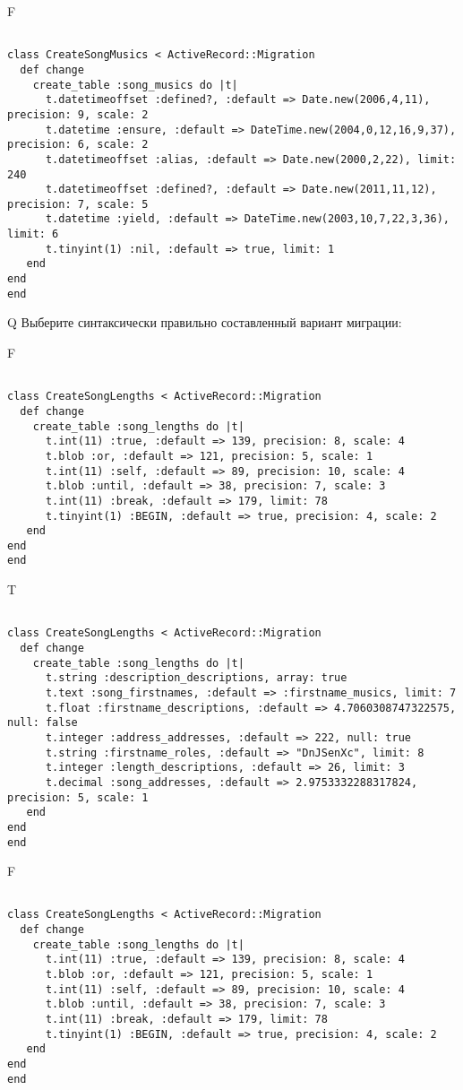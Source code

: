 F
\begin{verbatim}
		
class CreateSongMusics < ActiveRecord::Migration 
  def change 
    create_table :song_musics do |t| 
      t.datetimeoffset :defined?, :default => Date.new(2006,4,11), precision: 9, scale: 2
      t.datetime :ensure, :default => DateTime.new(2004,0,12,16,9,37), precision: 6, scale: 2
      t.datetimeoffset :alias, :default => Date.new(2000,2,22), limit: 240
      t.datetimeoffset :defined?, :default => Date.new(2011,11,12), precision: 7, scale: 5
      t.datetime :yield, :default => DateTime.new(2003,10,7,22,3,36), limit: 6
      t.tinyint(1) :nil, :default => true, limit: 1
   end
end
end
\end{verbatim}

Q
Выберите синтаксически правильно составленный вариант миграции:

F
\begin{verbatim}
		
class CreateSongLengths < ActiveRecord::Migration 
  def change 
    create_table :song_lengths do |t| 
      t.int(11) :true, :default => 139, precision: 8, scale: 4
      t.blob :or, :default => 121, precision: 5, scale: 1
      t.int(11) :self, :default => 89, precision: 10, scale: 4
      t.blob :until, :default => 38, precision: 7, scale: 3
      t.int(11) :break, :default => 179, limit: 78
      t.tinyint(1) :BEGIN, :default => true, precision: 4, scale: 2
   end
end
end
\end{verbatim}

T
\begin{verbatim}
		
class CreateSongLengths < ActiveRecord::Migration 
  def change 
    create_table :song_lengths do |t| 
      t.string :description_descriptions, array: true
      t.text :song_firstnames, :default => :firstname_musics, limit: 7
      t.float :firstname_descriptions, :default => 4.7060308747322575, null: false
      t.integer :address_addresses, :default => 222, null: true
      t.string :firstname_roles, :default => "DnJSenXc", limit: 8
      t.integer :length_descriptions, :default => 26, limit: 3
      t.decimal :song_addresses, :default => 2.9753332288317824, precision: 5, scale: 1
   end
end
end
\end{verbatim}

F
\begin{verbatim}
		
class CreateSongLengths < ActiveRecord::Migration 
  def change 
    create_table :song_lengths do |t| 
      t.int(11) :true, :default => 139, precision: 8, scale: 4
      t.blob :or, :default => 121, precision: 5, scale: 1
      t.int(11) :self, :default => 89, precision: 10, scale: 4
      t.blob :until, :default => 38, precision: 7, scale: 3
      t.int(11) :break, :default => 179, limit: 78
      t.tinyint(1) :BEGIN, :default => true, precision: 4, scale: 2
   end
end
end
\end{verbatim}

